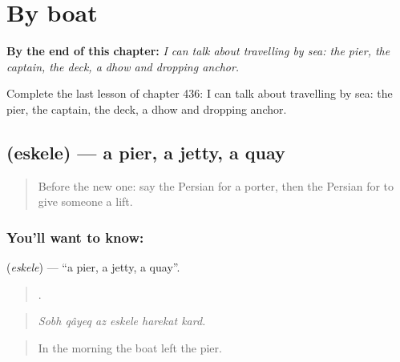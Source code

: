 
\chapter{By boat}
\label{ch:fa-by-boat}

\begin{chapteropening}
\textbf{By the end of this chapter:} \emph{I can talk about travelling by sea: the pier, the captain, the deck, a dhow and dropping anchor.}

Complete the last lesson of chapter 436: I can talk about travelling by sea: the pier, the captain, the deck, a dhow and dropping anchor.
\end{chapteropening}

\section[\texorpdfstring{\fa{اسکله} (eskele)}{اسکله (eskele)}]{ (eskele) — a pier, a jetty, a quay}

\label{lesson:FA-C436-eskele}



\begin{quote}
Before the new one: say the Persian for a porter, then the Persian for to give someone a lift.
\end{quote}

\subsection*{You'll want to know: }
\textbf{} (\emph{eskele}) — \textquotedblleft{}a pier, a jetty, a quay\textquotedblright{}.

\begin{quote}
     .
\end{quote}

\begin{quote}
\emph{Sobh qâyeq az eskele harekat kard.}
\end{quote}

\begin{quote}
In the morning the boat left the pier.
\end{quote}

